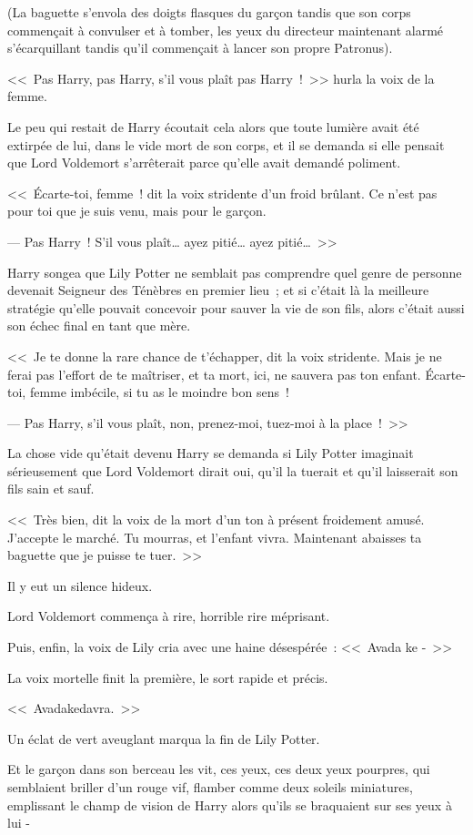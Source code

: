 (La baguette s'envola des doigts flasques du garçon tandis que son corps commençait à convulser et à tomber, les yeux du directeur maintenant alarmé s'écarquillant tandis qu'il commençait à lancer son propre Patronus).
\begin{em}

<<~Pas Harry, pas Harry, s'il vous plaît pas Harry~!~>> hurla la voix de la femme.

Le peu qui restait de Harry écoutait cela alors que toute lumière avait été extirpée de lui, dans le vide mort de son corps, et il se demanda si elle pensait que Lord Voldemort s'arrêterait parce qu'elle avait demandé poliment.

<<~Écarte-toi, femme~! dit la voix stridente d'un froid brûlant. Ce n'est pas pour toi que je suis venu, mais pour le garçon.

--- Pas Harry~! S'il vous plaît… ayez pitié… ayez pitié…~>>

Harry songea que Lily Potter ne semblait pas comprendre quel genre de personne devenait Seigneur des Ténèbres en premier lieu~; et si c'était là la meilleure stratégie qu'elle pouvait concevoir pour sauver la vie de son fils, alors c'était aussi son échec final en tant que mère.

<<~Je te donne la rare chance de t'échapper, dit la voix stridente. Mais je ne ferai pas l'effort de te maîtriser, et ta mort, ici, ne sauvera pas ton enfant. Écarte-toi, femme imbécile, si tu as le moindre bon sens~!

--- Pas Harry, s'il vous plaît, non, prenez-moi, tuez-moi à la place~!~>>

La chose vide qu'était devenu Harry se demanda si Lily Potter imaginait sérieusement que Lord Voldemort dirait oui, qu'il la tuerait et qu'il laisserait son fils sain et sauf.

<<~Très bien, dit la voix de la mort d'un ton à présent froidement amusé. J'accepte le marché. Tu mourras, et l'enfant vivra. Maintenant abaisses ta baguette que je puisse te tuer.~>>

Il y eut un silence hideux.

Lord Voldemort commença à rire, horrible rire méprisant.

Puis, enfin, la voix de Lily cria avec une haine désespérée~: <<~Avada ke -~>>

La voix mortelle finit la première, le sort rapide et précis.

<<~Avadakedavra.~>>

Un éclat de vert aveuglant marqua la fin de Lily Potter.

Et le garçon dans son berceau les vit, ces yeux, ces deux yeux pourpres, qui semblaient briller d'un rouge vif, flamber comme deux soleils miniatures, emplissant le champ de vision de Harry alors qu'ils se braquaient sur ses yeux à lui -

\end{em}

